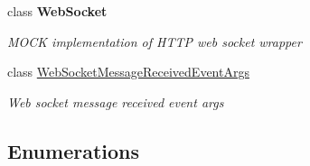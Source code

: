 \begin{DoxyCompactItemize}
class {\bfseries Web\+Socket}
\begin{DoxyCompactList}\small\item\em M\+O\+CK implementation of H\+T\+TP web socket wrapper \end{DoxyCompactList}\item 
class \hyperlink{class_microsoft_1_1_tools_1_1_windows_device_portal_1_1_web_socket_message_received_event_args}{Web\+Socket\+Message\+Received\+Event\+Args}
\begin{DoxyCompactList}\small\item\em Web socket message received event args \end{DoxyCompactList}\end{DoxyCompactItemize}
\subsection*{Enumerations}

